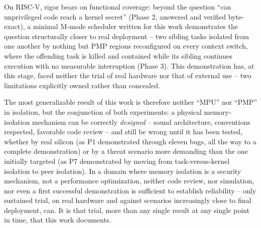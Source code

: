 \documentclass[sigconf,nonacm]{acmart}
\begin{document}
On RISC-V, rigor bears on functional coverage: beyond the question ``can unprivileged code reach a kernel secret'' (Phase 2, answered and verified byte-exact), a minimal M-mode scheduler written for this work demonstrates the question structurally closer to real deployment -- two sibling tasks isolated from one another by nothing but PMP regions reconfigured on every context switch, where the offending task is killed and contained while its sibling continues execution with no measurable interruption (Phase 3). This demonstration has, at this stage, faced neither the trial of real hardware nor that of external use -- two limitations explicitly owned rather than concealed.

The most generalizable result of this work is therefore neither ``MPU'' nor ``PMP'' in isolation, but the conjunction of both experiments: a physical memory-isolation mechanism can be correctly \emph{designed} -- sound architecture, conventions respected, favorable code review -- and still be wrong until it has been tested, whether by real silicon (as P1 demonstrated through eleven bugs, all the way to a complete demonstration) or by a threat scenario more demanding than the one initially targeted (as P7 demonstrated by moving from task-versus-kernel isolation to peer isolation). In a domain where memory isolation is a security mechanism, not a performance optimization, neither code review, nor simulation, nor even a first successful demonstration is sufficient to establish reliability -- only sustained trial, on real hardware and against scenarios increasingly close to final deployment, can. It is that trial, more than any single result at any single point in time, that this work documents.



\end{document}
